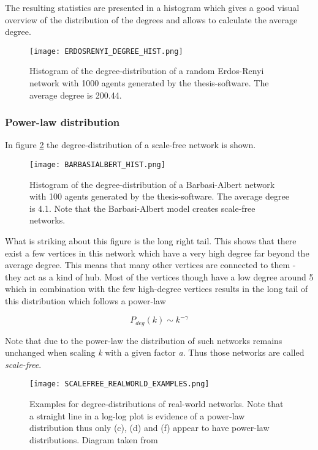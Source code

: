 \documentclass[../Bachelorarbeit.tex]{subfiles}
\begin{document}
The resulting statistics are presented in a histogram which gives a good visual overview of the distribution of the degrees and allows to calculate the average degree. 

\begin{figure}[H]
	\centering
  \texttt{[image: ERDOSRENYI\_DEGREE\_HIST.png]}
  	\caption{Histogram of the degree-distribution of a random Erdos-Renyi network with 1000 agents generated by the thesis-software. The average degree is 200.44.}
	\label{fig:ERDOSRENYI_DEGREE_HIST}
\end{figure}

\subsubsection{Power-law distribution}
In figure \ref{fig:BARBASIALBERT_HIST} the degree-distribution of a scale-free network is shown.

\begin{figure}[H]
	\centering
  \texttt{[image: BARBASIALBERT\_HIST.png]}
  	\caption{Histogram of the degree-distribution of a Barbasi-Albert network with 100 agents generated by the thesis-software. The average degree is 4.1. Note that the Barbasi-Albert model creates scale-free networks.}
	\label{fig:BARBASIALBERT_HIST}
\end{figure}

What is striking about this figure is the long right tail. This shows that there exist a few vertices in this network which have a very high degree far beyond the average degree. This means that many other vertices are connected to them - they act as a kind of hub. Most of the vertices though have a low degree around 5 which in combination with the few high-degree vertices results in the long tail of this distribution which follows a power-law

\begin{equation}
P_{deg}(k) \sim k^{-\gamma}
\end{equation}

Note that due to the power-law the distribution of such networks remains unchanged when scaling \textit{k} with a given factor \textit{a}. Thus those networks are called \textit{scale-free}.

\begin{figure}[H]
	\centering
  \texttt{[image: SCALEFREE\_REALWORLD\_EXAMPLES.png]}
  	\caption{Examples for degree-distributions of real-world networks. Note that a straight line in a log-log plot is evidence of a power-law distribution thus only (c), (d) and (f) appear to have power-law distributions. Diagram taken from \cite{Newman_ComplexNetworks} }
	\label{fig:SCALEFREE_REALWORLD_EXAMPLES}
\end{figure}
\end{document}
